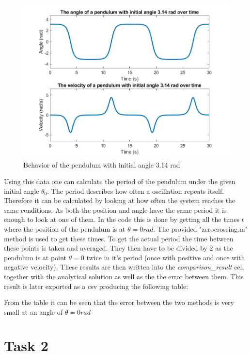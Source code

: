 \documentclass[14pt]{article}
\begin{document}
\begin{figure}[H]
  \includegraphics[width=14cm]{./output/assignment1/3.14_rad.png}
  \caption{Behavior of the pendulum with initial angle 3.14 rad}
  \label{fig:figure5}
\end{figure}

Using this data one can calculate the period of the pendulum under the given
initial angle $\theta_0$. The period describes how often a oscillation repeats itself.
Therefore it can be calculated by looking at how often the system reaches the same conditions.
As both the position and angle have the same period it is enough to look at one of them.
In the code this is done by getting all the times $t$ where the position of the pendulum
is at $\theta = 0 rad$. The provided "zerocrossing.m" method is used to get these times. To get the actual period
the time between these points is taken and averaged. They then have to be divided by 2 as the pendulum
is at point $\theta = 0$ twice in it's period (once with positive and once with negative velocity). These results
are then written into the \textit{comparison\_result} cell together with the analytical solution as well as the
the error between them. This result is later exported as a csv producing the following table:


From the table it can be seen that the error between the two methods is very small at an angle of $\theta = 0 rad$

\section{Task 2}
\end{document}
